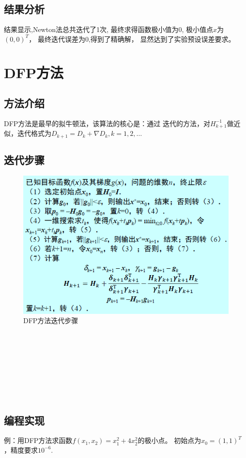 \documentclass[12pt,a4paper]{article}
\begin{document}
\subsection{结果分析}

结果显示,Newton法总共迭代了1次,
最终求得函数极小值为0,
极小值点$x$为$(0,0)^T$，
最终迭代误差为0,得到了精确解，
显然达到了实验预设误差要求。

\section{DFP方法}
\subsection{方法介绍}
DFP方法是最早的拟牛顿法，该算法的核心是：通过 迭代的方法，对$H_{k+1}^{-1}$做近似，迭代格式为$D_{k+1}=D_k+\nabla D_k,k=1,2,\dots$

\subsection{迭代步骤}
\begin{figure}
    \centering
    \includegraphics[scale=0.6]{DFP.png}
    \caption{DFP方法迭代步骤}
    \label{fig:3}
\end{figure}
~\\~\\~\\~\\~\\~\\~\\
\subsection{编程实现}
例：用DFP方法求函数$f(x_1,x_2)=x_1^2+4x_2^2$的极小点。
初始点为$x_0=(1,1)^T$，精度要求$10^{-6}$.
\end{document}
